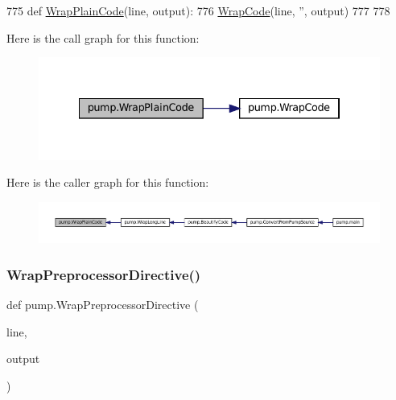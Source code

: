 \begin{DoxyCode}
775 \textcolor{keyword}{def }\hyperlink{namespacepump_a60723738cc38d8ced7e2cfecc72d8b11}{WrapPlainCode}(line, output):
776   \hyperlink{namespacepump_a42502545a37fcd4513a0a7ac8ef3c0eb}{WrapCode}(line, \textcolor{stringliteral}{''}, output)
777 
778 
\end{DoxyCode}
Here is the call graph for this function\+:
\nopagebreak
\begin{figure}[H]
\begin{center}
\leavevmode
\includegraphics[width=334pt]{namespacepump_a60723738cc38d8ced7e2cfecc72d8b11_cgraph}
\end{center}
\end{figure}
Here is the caller graph for this function\+:
\nopagebreak
\begin{figure}[H]
\begin{center}
\leavevmode
\includegraphics[width=350pt]{namespacepump_a60723738cc38d8ced7e2cfecc72d8b11_icgraph}
\end{center}
\end{figure}
\mbox{\label{namespacepump_a59e8ae06bae068d2d72df4f0340635d8}} 
\subsubsection{\texorpdfstring{Wrap\+Preprocessor\+Directive()}{WrapPreprocessorDirective()}}
{\footnotesize\ttfamily def pump.\+Wrap\+Preprocessor\+Directive (\begin{DoxyParamCaption}\item[{}]{line,  }\item[{}]{output }\end{DoxyParamCaption})}




